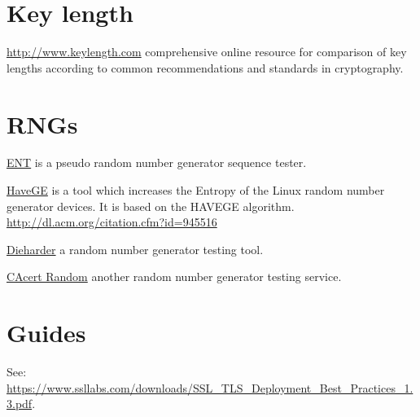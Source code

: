 \section{Key length}
\begin{itemize*}
  \item \url{http://www.keylength.com} comprehensive online resource for comparison of key lengths according to common recommendations and standards in cryptography.
\end{itemize*}


\section{RNGs}

\begin{itemize*}
  \item \href{http://www.fourmilab.ch/random/}{ENT} is a pseudo random number generator sequence tester.
  \item \href{http://www.issihosts.com/haveged/}{HaveGE} is a tool which increases the Entropy of the Linux random number generator devices. It is based on the HAVEGE algorithm. \url{http://dl.acm.org/citation.cfm?id=945516}
  \item \href{http://www.phy.duke.edu/~rgb/General/dieharder.php}{Dieharder} a random number generator testing tool.
  \item \href{http://www.cacert.at/random/}{CAcert Random} another random number generator testing service.
\end{itemize*}

\section{Guides}
\begin{itemize*}
  \item See: \url{https://www.ssllabs.com/downloads/SSL_TLS_Deployment_Best_Practices_1.3.pdf}.
\end{itemize*}
